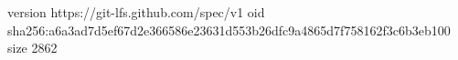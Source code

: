 version https://git-lfs.github.com/spec/v1
oid sha256:a6a3ad7d5ef67d2e366586e23631d553b26dfc9a4865d7f758162f3c6b3eb100
size 2862
